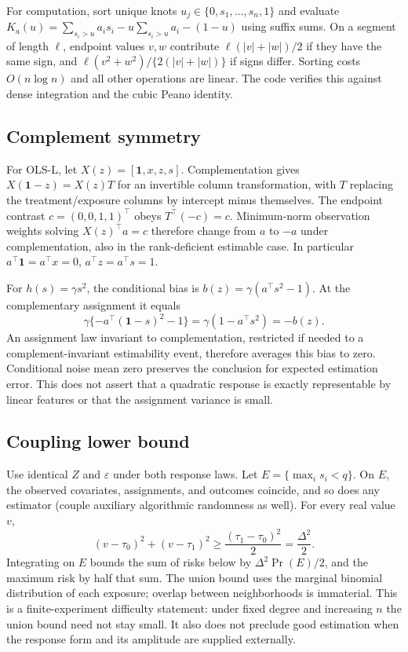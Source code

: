 \documentclass{article}
\newcommand{\one}{\mathbf 1}
\begin{document}
For computation, sort unique knots $u_j\in\{0,s_1,\ldots,s_n,1\}$ and evaluate
$K_a(u)=\sum_{s_i>u}a_i s_i-u\sum_{s_i>u}a_i-(1-u)$ using suffix sums. On a segment of length $\ell$, endpoint values $v,w$ contribute $\ell(|v|+|w|)/2$ if they have the same sign, and
$\ell(v^2+w^2)/\{2(|v|+|w|)\}$ if signs differ. Sorting costs $O(n\log n)$ and all other operations are linear. The code verifies this against dense integration and the cubic Peano identity.

\subsection{Complement symmetry}
For OLS-L, let $X(z)=[\one,x,z,s]$. Complementation gives $X(\one-z)=X(z)T$ for an invertible column transformation, with $T$ replacing the treatment/exposure columns by intercept minus themselves. The endpoint contrast $c=(0,0,1,1)^\top$ obeys $T^\top(-c)=c$. Minimum-norm observation weights solving $X(z)^\top a=c$ therefore change from $a$ to $-a$ under complementation, also in the rank-deficient estimable case. In particular $a^\top\one=a^\top x=0$, $a^\top z=a^\top s=1$.

For $h(s)=\gamma s^2$, the conditional bias is $b(z)=\gamma(a^\top s^2-1)$. At the complementary assignment it equals
\[
\gamma\{-a^\top(\one-s)^2-1\}
=\gamma(1-a^\top s^2)=-b(z).
\]
An assignment law invariant to complementation, restricted if needed to a complement-invariant estimability event, therefore averages this bias to zero. Conditional noise mean zero preserves the conclusion for expected estimation error. This does not assert that a quadratic response is exactly representable by linear features or that the assignment variance is small.

\subsection{Coupling lower bound}
Use identical $Z$ and $\varepsilon$ under both response laws. Let $E=\{\max_i s_i<q\}$. On $E$, the observed covariates, assignments, and outcomes coincide, and so does any estimator (couple auxiliary algorithmic randomness as well). For every real value $v$,
\[
(v-\tau_0)^2+(v-\tau_1)^2\ge\frac{(\tau_1-\tau_0)^2}{2}=\frac{\Delta^2}{2}.
\]
Integrating on $E$ bounds the sum of risks below by $\Delta^2\Pr(E)/2$, and the maximum risk by half that sum. The union bound uses the marginal binomial distribution of each exposure; overlap between neighborhoods is immaterial. This is a finite-experiment difficulty statement: under fixed degree and increasing $n$ the union bound need not stay small. It also does not preclude good estimation when the response form and its amplitude are supplied externally.
\end{document}
